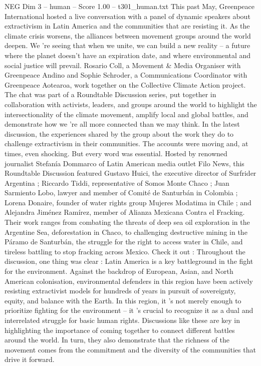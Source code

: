\begin{textsample}{NEG Dim 3 – human – Score 1.00 – t301\_human.txt}  \label{ex:f3_neg_049}
This past May, Greenpeace International hosted a live conversation with a panel of dynamic speakers about extractivism in Latin America and the communities that are resisting it.
As the climate crisis worsens, the alliances between movement groups around the world deepen.
We ’re seeing that when we unite, we can build a new reality – a future where the planet doesn't have an expiration date, and where environmental and social justice will prevail.
Rosario Coll, a Movement \& Media Organiser with Greenpeace Andino and Sophie Schroder, a Communications Coordinator with Greenpeace Aotearoa, work together on the Collective Climate Action project.
The chat was part of a Roundtable Discussion series, put together in collaboration with activists, leaders, and groups around the world to highlight the intersectionality of the climate movement, amplify local and global battles, and demonstrate how we ’re all more connected than we may think.
In the latest discussion, the experiences shared by the group about the work they do to challenge extractivism in their communities.
The accounts were moving and, at times, even shocking.
But every word was essential.
Hosted by renowned journalist Stefanía Dommarco of Latin American media outlet Filo News, this Roundtable Discussion featured Gustavo Huici, the executive director of Surfrider Argentina ; Riccardo Tiddi, representative of Somos Monte Chaco ; Juan Sarmiento Lobo, lawyer and member of Comité de Santurbán in Colombia ; Lorena Donaire, founder of water rights group Mujeres Modatima in Chile ; and Alejandra Jiménez Ramírez, member of Alianza Mexicana Contra el Fracking.
Their work ranges from combating the threats of deep sea oil exploration in the Argentine Sea, deforestation in Chaco, to challenging destructive mining in the Páramo de Santurbán, the struggle for the right to access water in Chile, and tireless battling to stop fracking across Mexico.
Check it out : Throughout the discussion, one thing was clear : Latin America is a key battleground in the fight for the environment.
Against the backdrop of European, Asian, and North American colonisation, environmental defenders in this region have been actively resisting extractivist models for hundreds of years in pursuit of sovereignty, equity, and balance with the Earth.
In this region, it ’s not merely enough to prioritize fighting for the environment – it ’s crucial to recognize it as a dual and interrelated struggle for basic human rights.
Discussions like these are key in highlighting the importance of coming together to connect different battles around the world.
In turn, they also demonstrate that the richness of the movement comes from the commitment and the diversity of the communities that drive it forward.

\end{textsample}
